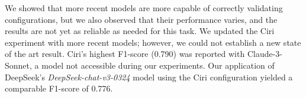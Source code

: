 We showed that more recent models are more capable of correctly validating configurations, but we also observed that their performance varies, and the results are not yet as reliable as needed for this task. We updated the Ciri experiment with more recent models; however, we could not establish a new state of the art result. Ciri's highest F1-score (0.790) was reported with Claude-3-Sonnet, a model not accessible during our experiments. Our application of DeepSeek's \textit{DeepSeek-chat-v3-0324} model using the Ciri configuration yielded a comparable F1-score of 0.776.